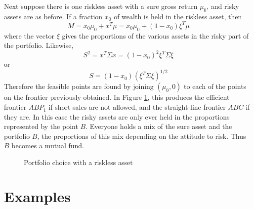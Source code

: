 Next suppose there is one riskless asset with a sure gross return $\mu_0$, and risky assets are as before. If a fraction $x_0$ of wealth is held in the riskless asset, then
\begin{equation*} 
M = x_0 \mu_0 + x^T \mu = x_0 \mu_0 + (1-x_0) \xi^T  \mu
\end{equation*}
where the vector $\xi$ gives the proportions of the various assets in the risky part of the portfolio. Likewise,
\begin{equation*} 
S^2 = x^T \Sigma x = (1-x_0)^2 \xi^T \Sigma \xi
\end{equation*}
or
\begin{equation*} 
 S=(1-x_0) (\xi^T \Sigma \xi)^{1/2}
\end{equation*}
Therefore the feasible points are found by joining $(\mu_0, 0)$ to each of the points on the frontier previously obtained. In Figure \ref{Fig9.2}, this produces the efficient frontier $ABP_1$ if short sales are not allowed, and the straight-line frontier $ABC$ if they are. In this case the risky assets are only ever held in the proportions represented by the point $B$. Everyone holds a mix of the sure asset and the portfolio $B$, the proportions of this mix depending on the attitude to risk. Thus $B$ becomes a mutual fund.

\begin{figure}[!htb] %
\centering %
\caption{Portfolio choice with a riskless asset} %
\label{Fig9.2} %
\end{figure}

\section*{Examples}

